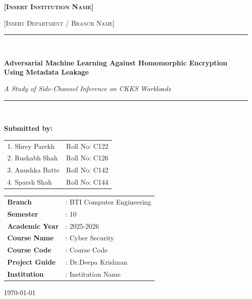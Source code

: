 \documentclass[12pt,a4paper]{article}
\begin{document}
\begin{titlepage}
\centering
\vspace*{0.4in}

{\scshape\large \textbf{[Insert Institution Name]} \par}
\vspace{0.1in}
{\scshape [Insert Department / Branch Name] \par}
\vspace{0.6in}

\rule{\textwidth}{0.6pt}\\[0.3in]
{\huge \bfseries Adversarial Machine Learning Against Homomorphic Encryption Using Metadata Leakage \par}
\vspace{0.2in}
{\large \textit{A Study of Side-Channel Inference on CKKS Workloads} \par}
\rule{\textwidth}{0.6pt}\\[0.6in]

\begin{flushleft}
\textbf{Submitted by:}\\[0.15in]
\begin{tabular}{ll}
1. Shrey Parekh & Roll No: C122 \\
2. Rushabh Shah & Roll No: C126 \\
3. Anushka Batte & Roll No: C142 \\
4. Sparsh Shah & Roll No: C144 \\
\end{tabular}

\vspace{0.35in}
\begin{tabular}{ll}
\textbf{Branch}            & : BTI Computer Engineering \\
\textbf{Semester}          & : 10 \\
\textbf{Academic Year}     & : 2025-2026 \\
\textbf{Course Name}       & : Cyber Security \\
\textbf{Course Code}       & : Course Code \\
\textbf{Project Guide}     & : Dr.Deepa Krishnan \\
\textbf{Institution}       & : Institution Name \\
\end{tabular}
\end{flushleft}

\vfill
{\large \today}
\end{titlepage}
\end{document}
